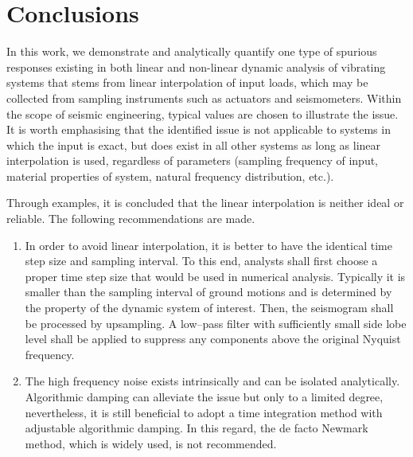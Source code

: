 \section{Conclusions}
In this work, we demonstrate and analytically quantify one type of spurious responses existing in both linear and non-linear dynamic analysis of vibrating systems that stems from linear interpolation of input loads, which may be collected from sampling instruments such as actuators and seismometers. Within the scope of seismic engineering, typical values are chosen to illustrate the issue. It is worth emphasising that the identified issue is not applicable to systems in which the input is exact, but does exist in all other systems as long as linear interpolation is used, regardless of parameters (sampling frequency of input, material properties of system, natural frequency distribution, etc.).

Through examples, it is concluded that the linear interpolation is neither ideal or reliable. The following recommendations are made.
\begin{enumerate}
\item In order to avoid linear interpolation, it is better to have the identical time step size and sampling interval. To this end, analysts shall first choose a proper time step size that would be used in numerical analysis. Typically it is smaller than the sampling interval of ground motions and is determined by the property of the dynamic system of interest. Then, the seismogram shall be processed by upsampling. A low--pass filter with sufficiently small side lobe level shall be applied to suppress any components above the original Nyquist frequency.
\item The high frequency noise exists intrinsically and can be isolated analytically. Algorithmic damping can alleviate the issue but only to a limited degree, nevertheless, it is still beneficial to adopt a time integration method with adjustable algorithmic damping. In this regard, the de facto Newmark method, which is widely used, is not recommended.
\end{enumerate}

